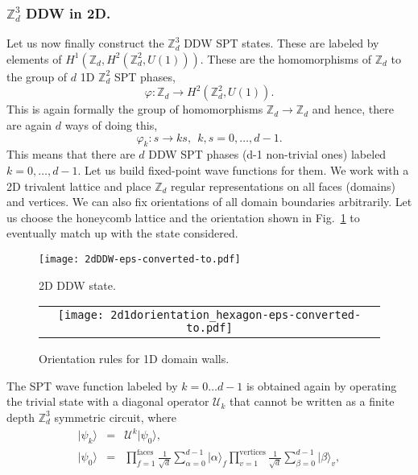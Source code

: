 \documentclass[aps,amsfonts,pra,twocolumn,showpacs]{revtex4-1}
\def\ket#1{\vert#1\rangle}
\newcommand{\zd}{\mathbb{Z}_d}
\begin{document}
\subsubsection{$\zd^3$ DDW in 2D.}

Let us now finally construct the $\zd^3$ DDW SPT states. These are labeled by elements of $H^1(\mathbb{Z}_d,H^2(\mathbb{Z}_d^2,U(1)))$. These are the homomorphisms of $\zd$ to the group of $d$ 1D $\zd^2$ SPT phases,
	\begin{equation}
	\varphi: \zd \rightarrow H^2(\mathbb{Z}_d^2,U(1)).
	\end{equation}
This is again formally the group of homomorphisms $\zd \rightarrow \zd$ and hence, there are again $d$ ways of doing this,
	\begin{equation}
	\varphi_k: s \rightarrow ks,~~k,s = 0,\ldots, {d-1}.
	\end{equation}
This means that there are $d$ DDW SPT phases (d-1 non-trivial ones) labeled $k=0,\ldots,d-1$. Let us build fixed-point wave functions for them. We work with a 2D trivalent lattice and place $\zd$ regular representations on all faces (domains) and vertices. We can also fix orientations of all domain boundaries arbitrarily. Let us choose the honeycomb lattice and the orientation shown in Fig.~\ref{fig:2d_DDW} to eventually match up with the state considered. 

\begin{figure}[!htb]
	\texttt{[image: 2dDDW-eps-converted-to.pdf]}
	\caption{2D DDW state. \label{fig:2d_DDW}}
\end{figure}

\begin{figure}[!htb]
	\begin{tabular}{c}
		\texttt{[image: 2d1dorientation\_hexagon-eps-converted-to.pdf]}			
	\end{tabular}
	\caption{Orientation rules for 1D domain walls. \label{fig:2d1dorientation}}
\end{figure}

The SPT wave function labeled by $k = 0 \ldots d-1$ is obtained again by operating the trivial state with a diagonal operator $\mathcal{U}_k$ that cannot be written as a finite depth $\zd^3$ symmetric circuit, where
	\begin{eqnarray}
	\ket{\psi_k} &=& \mathcal{U}^k \ket{\psi_0},\\
	\ket{\psi_0} &=& \prod_{f=1}^\text{faces} \frac{1}{\sqrt{d}} \sum_{\alpha=0}^{d-1} \ket{\alpha}_f \prod_{v=1}^{\text{vertices}} \frac{1}{\sqrt{d}} \sum_{\beta=0}^{d-1} \ket{\beta}_v,
	\end{eqnarray}
	
\end{document}
